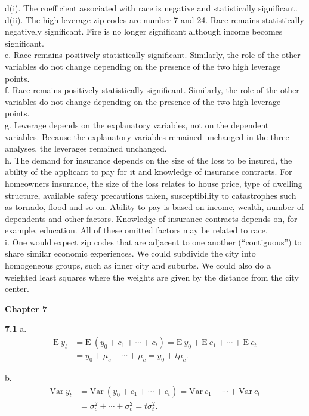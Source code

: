 d(i). The coefficient associated with race is negative and
statistically significant.\\
d(ii). The high leverage zip codes are number 7 and 24. Race remains
statistically negatively significant. Fire is no longer significant
although income becomes significant.\\
e. Race remains positively statistically significant. Similarly, the
role of the other variables do not change depending on the presence
of the two high leverage points.\\
f. Race remains positively statistically significant. Similarly, the
role of the other variables do not change depending on the presence
of the two high leverage points.\\
g. Leverage depends on the explanatory variables, not on the
dependent variables. Because the explanatory variables remained
unchanged in the three analyses, the leverages remained unchanged.\\
h. The demand for insurance depends on the size of the loss to be
insured, the ability of the applicant to pay for it and knowledge of
insurance contracts. For homeowners insurance, the size of the loss
relates to house price, type of dwelling structure, available safety
precautions taken, susceptibility to catastrophes such as tornado,
flood and so on. Ability to pay is based on income, wealth, number
of dependents and other factors. Knowledge of insurance contracts
depends on, for example, education. All of these omitted factors may
be related to race.\\
i. One would expect zip codes that are adjacent to one another
(``contiguous'') to share similar economic experiences. We could
subdivide the city into homogeneous groups, such as inner city and
suburbs. We could also do a weighted least squares where the weights
are given by the distance from the city center.

\begin{center}\large \textbf{Chapter 7}\end{center}

\textbf{7.1} a. \begin{align*}
\textrm{E}~y_t &= \textrm{E}~(y_0+c_1+\cdots+c_t)=\textrm{E}~y_0+\textrm{E}~c_1+\cdots+\textrm{E}~c_t\\
&= y_0+\mu_c+\cdots+\mu_c = y_0 + t \mu_c.
\end{align*}

b. \begin{align*}
\textrm{Var}~y_t &= \textrm{Var}~(y_0+c_1+\cdots+c_t)=\textrm{Var}~c_1+\cdots+\textrm{Var}~c_t\\
&=\sigma_c^2+\cdots+\sigma_c^2 = t\sigma_t^2.
\end{align*}


